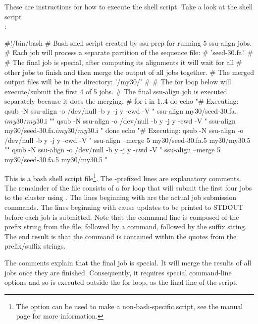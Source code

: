 These are instructions for how to execute the shell script. Take a
look at the shell script \\ :

\begin{sreoutput}
#!/bin/bash
# Bash shell script created by ssu-prep for running 5 ssu-align jobs.
# Each job will process a separate partition of the sequence file:
# 'seed-30.fa'.
#
# The final job is special, after computing its alignments it will wait for all
# other jobs to finish and then merge the output of all jobs together.
# The merged output files will be in the directory: '/my30/'
#
# The for loop below will execute/submit the first 4 of 5 jobs.
# The final ssu-align job is executed separately because it does the merging.
#
for i in {1..4}
do
	echo "# Executing: qsub -N ssu-align -o /dev/null -b y -j y -cwd -V " ssu-align my30/seed-30.fa.$i my30/my30.$i ""
	qsub -N ssu-align -o /dev/null -b y -j y -cwd -V " ssu-align my30/seed-30.fa.$i my30/my30.$i "
done
echo "# Executing: qsub -N ssu-align -o /dev/null -b y -j y -cwd -V " ssu-align --merge 5 my30/seed-30.fa.5 my30/my30.5 ""
qsub -N ssu-align -o /dev/null -b y -j y -cwd -V " ssu-align --merge 5 my30/seed-30.fa.5 my30/my30.5 "
\end{sreoutput}

This is a bash shell script file\footnote{The  option
  can be used to make a non-bash-specific script, see the
   manual page for more information.}.
The \prog{\#}-prefixed lines are
explanatory comments. The remainder of the file consists of a for loop
that will submit the first four  jobs to the cluster
using . The lines beginning with  are the actual
job submission commands. The lines beginning with  cause updates to
be printed to STDOUT before each job is submitted. 
Note that the  command line is composed
of the prefix string from the  file,
followed by a  command, followed by the suffix
string. The end result is that the  command is
contained within the quotes from the prefix/suffix strings.

The comments explain that the final job is special. It will merge the
results of all jobs once they are finished. Consequently, it requires
special command-line options and so is executed outside the for loop,
as the final line of the script.

\begin{comment}
The final important part of the \prog{ssu-prep} output explains what
to do if any of the jobs fail: 

\begin{sreoutput}
# If one or more jobs fail: rerun the failed jobs, wait for them to finish,
# and then perform manual merge from this directory by executing:
#	ssu-merge my30
\end{sreoutput}

This should happen only rarely, but if any jobs fail, this aspect of
the program allows 
\end{comment}

